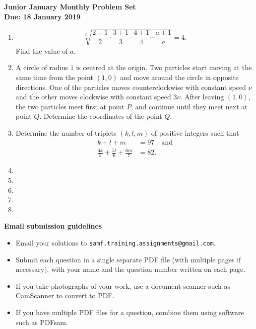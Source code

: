 \documentclass{article}
\begin{document}
\begin{center}
\textbf{\Large Junior January Monthly Problem Set}
\\ \vspace{1em}
\textbf{\large Due: 18 January 2019}
\end{center}

\begin{enumerate}[1.]

\vspace{6pt}
\item %
\[ \sqrt[3]{\frac{2+1}{2}\cdot\frac{3+1}{3}\cdot\frac{4+1}{4}\dotsm\frac{a+1}{a}} = 4. \]
Find the value of $a$.


\vspace{6pt}
\item %
A circle of radius $1$ is centred at the origin. Two particles start moving at the same time from the point $(1,0)$ and move around the circle in opposite directions. One of the particles moves counterclockwise with constant speed $\nu$ and the other moves clockwise with constant speed $3\nu$. After leaving $(1,0)$, the two particles meet first at point $P$, and continue until they meet next at point $Q$. Determine the coordinates of the point $Q$.


\vspace{6pt}
\item %
Determine the number of triplets $(k,l,m)$ of positive integers such that
\begin{align*}
  k+l+m &= 97 \quad \mathrm{and} \\
  \frac{4k}{5} +\frac{5l}{6} +\frac{6m}{7} &= 82.
\end{align*}


\vspace{6pt}
\item 


\vspace{6pt}
\item 


\vspace{6pt}
\item


\vspace{6pt}
\item


\vspace{6pt}
\item %


\end{enumerate}


\vfill
\textbf{\Large Email submission guidelines}
\begin{itemize}
	\item Email your solutions to \verb!samf.training.assignments@gmail.com!.
	\item Submit each question in a single separate PDF file (with multiple pages if necessary), with your name and the question number written on each page.
	\item If you take photographs of your work, use a document scanner such as CamScanner to convert to PDF.
	\item If you have multiple PDF files for a question, combine them using software such as PDFsam.
\end{itemize}
\end{document}
